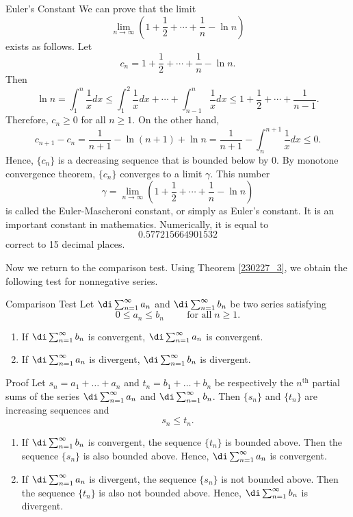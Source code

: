 \begin{example}[label=ex230228_7]{Euler's Constant}
We can prove that the limit
\[\lim_{n\to\infty}\left(1+ \frac{1}{2}+\cdots+\frac{1}{n}-\ln n\right)\]exists as follows. Let
\[c_n=1+ \frac{1}{2}+\cdots+\frac{1}{n}-\ln n.\] Then
\[\ln n=\int_1^n\frac{1}{x}dx\leq \int_1^2\frac{1}{x}dx+\cdots+\int_{n-1}^{n}\frac{1}{x}dx
\leq 1+ \frac{1}{2}+\cdots+\frac{1}{n-1}.\]
Therefore, $c_n\geq 0$ for all $n\geq 1$. On the other hand,
\[c_{n+1}-c_n=\frac{1}{n+1}-\ln (n+1)+\ln n=\frac{1}{n+1}-\int_n^{n+1}\frac{1}{x}dx\leq 0.\]Hence, $\{c_n\}$ is a decreasing sequence that is bounded below by 0. By monotone convergence theorem, $\{c_n\}$ converges to a limit $\gamma$. This number \[\gamma=\lim_{n\to\infty}\left(1+ \frac{1}{2}+\cdots+\frac{1}{n}-\ln n\right)\] is called the Euler-Mascheroni constant, or simply as Euler's constant. It is an important constant in mathematics. Numerically, it is equal to
\[0.577215664901532\]correct to 15 decimal places.

\end{example}

Now we return to the comparison test. 
Using Theorem \ref{230227_3}, we obtain the following   test for nonnegative series.
\begin{theorem}{Comparison Test}
Let $\di\sum_{n=1}^{\infty}a_n$ and $\di\sum_{n=1}^{\infty}b_n$ be two series satisfying
\[0\leq a_n\leq b_n\hspace{1cm}\text{for all}\;n\geq 1.\]
\begin{enumerate}[1.]
\item
If $\di\sum_{n=1}^{\infty}b_n$ is convergent, $\di\sum_{n=1}^{\infty}a_n$ is convergent.
\item
If $\di\sum_{n=1}^{\infty}a_n$ is divergent, $\di\sum_{n=1}^{\infty}b_n$ is divergent.
\end{enumerate}
\end{theorem}
\begin{myproof}{Proof}
Let
$s_n=a_1+\ldots+a_n$ and $t_n=b_1+\ldots+b_n$  be respectively the $n^{\text{th}}$ partial sums of the series $\di\sum_{n=1}^{\infty}a_n$ and $\di\sum_{n=1}^{\infty}b_n$.   Then $\{s_n\}$ and $\{t_n\}$ are increasing sequences and \[s_n\leq t_n.\]
\begin{enumerate}[1.]\item 
If $\di\sum_{n=1}^{\infty}b_n$ is convergent, the sequence $\{t_n\}$ is bounded above. Then the sequence $\{s_n\}$  is also bounded above. Hence, $\di\sum_{n=1}^{\infty}a_n$ is convergent.
\item 
If $\di\sum_{n=1}^{\infty}a_n$ is divergent, the sequence $\{s_n\}$ is not bounded above. Then the sequence $\{t_n\}$  is also not bounded above. Hence, $\di\sum_{n=1}^{\infty}b_n$ is divergent.
\end{enumerate}
\end{myproof}

